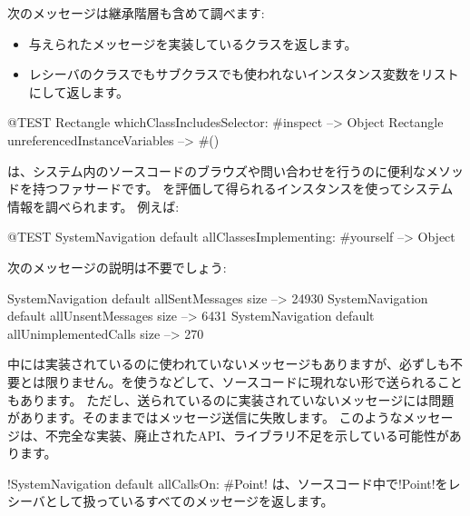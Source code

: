 \documentclass[a4paper,10pt,twoside]{book}
\begin{document}
次のメッセージは継承階層も含めて調べます:

\begin{itemize}
\item {} 与えられたメッセージを実装しているクラスを返します。
\item {} レシーバのクラスでもサブクラスでも使われないインスタンス変数をリストにして返します。
\end{itemize}

\begin{code}{@TEST}
Rectangle whichClassIncludesSelector: #inspect --> Object
Rectangle unreferencedInstanceVariables            --> #()
\end{code}

は、システム内のソースコードのブラウズや問い合わせを行うのに便利なメソッドを持つファサードです。
 を評価して得られるインスタンスを使ってシステム情報を調べられます。
例えば:

\begin{code}{@TEST}
SystemNavigation default allClassesImplementing: #yourself --> {Object}
\end{code}

次のメッセージの説明は不要でしょう:

\begin{code}{}
SystemNavigation default allSentMessages size          --> 24930
SystemNavigation default allUnsentMessages size      --> 6431
SystemNavigation default allUnimplementedCalls size --> 270
\end{code}

中には実装されているのに使われていないメッセージもありますが、必ずしも不要とは限りません。を使うなどして、ソースコードに現れない形で送られることもあります。
ただし、送られているのに実装されていないメッセージには問題があります。そのままではメッセージ送信に失敗します。
このようなメッセージは、不完全な実装、廃止されたAPI、ライブラリ不足を示している可能性があります。

\ct!SystemNavigation default allCallsOn: #Point! は、ソースコード中で\ct!Point!をレシーバとして扱っているすべてのメッセージを返します。
\end{document}
